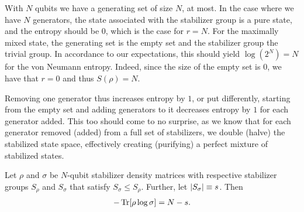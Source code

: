 With $N$ qubits we have a generating set of size $N$, at most. In the case
where we have $N$ generators, the state associated with the stabilizer group is
a pure state, and the entropy should be $0$, which is the case for $r=N$. For
the maximally mixed state, the generating set is the empty set and the
stabilizer group the trivial group. In accordance to our expectations, this
should yield $\log(2^N)= N$ for the von Neumann entropy. Indeed, since the size of
the empty set is $0$, we have that $r=0$ and thus $S(\rho) = N$.

Removing one generator thus increases entropy by $1$, or put differently,
starting from the empty set and adding generators to it decreases entropy by
$1$ for each generator added. This too should come to no surprise, as we know
that for each generator removed (added) from a full set of stabilizers, we
double (halve) the stabilized state space, effectively creating (purifying) a
perfect mixture of stabilized states.

\begin{thm}\label{thm:cross-ent-stab}
  Let $\rho$ and $\sigma$ be $N$-qubit stabilizer density matrices with
  respective stabilizer groups $S_\rho$ and $S_\sigma$ that satisfy $S_\sigma \leq
  S_\rho$. Further, let $\abs{S_\sigma} \equiv s$. Then
  \begin{align}\label{eq:cross-ent-stab}
    -\Tr[\rho\log\sigma] = N - s
  .\end{align}
\end{thm}

